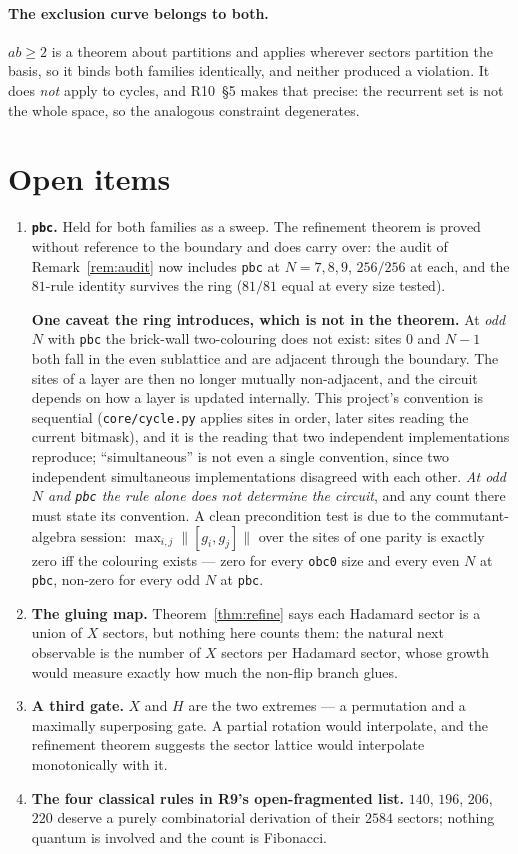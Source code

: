 \documentclass[11pt]{article}
\newcommand{\rt}[1]{\texttt{#1}}
\newcommand{\fn}[1]{\texttt{#1}}
\theoremstyle{plain}
\theoremstyle{remark}
\begin{document}
\paragraph{The exclusion curve belongs to both.} $ab\ge2$ is a theorem about
partitions and applies wherever sectors partition the basis, so it binds both
families identically, and neither produced a violation. It does \emph{not} apply
to cycles, and R10~\S5 makes that precise: the recurrent set is not the whole
space, so the analogous constraint degenerates.

\section{Open items}

\begin{enumerate}
\item \textbf{\rt{pbc}.} Held for both families as a sweep. The refinement
  theorem is proved without reference to the boundary and does carry over: the
  audit of Remark~\ref{rem:audit} now includes \fn{pbc} at $N=7,8,9$, $256/256$
  at each, and the $81$-rule identity survives the ring ($81/81$ equal at every
  size tested).

  \textbf{One caveat the ring introduces, which is not in the theorem.} At
  \emph{odd} $N$ with \fn{pbc} the brick-wall two-colouring does not exist: sites
  $0$ and $N-1$ both fall in the even sublattice and are adjacent through the
  boundary. The sites of a layer are then no longer mutually non-adjacent, and
  the circuit depends on how a layer is updated internally. This project's
  convention is sequential (\fn{core/cycle.py} applies sites in order, later
  sites reading the current bitmask), and it is the reading that two independent
  implementations reproduce; ``simultaneous'' is not even a single convention,
  since two independent simultaneous implementations disagreed with each other.
  \emph{At odd $N$ and \fn{pbc} the rule alone does not determine the circuit},
  and any count there must state its convention. A clean precondition test is
  due to the commutant-algebra session: $\max_{i,j}\lVert[g_i,g_j]\rVert$ over
  the sites of one parity is exactly zero iff the colouring exists --- zero for
  every \fn{obc0} size and every even $N$ at \fn{pbc}, non-zero for every odd
  $N$ at \fn{pbc}.
\item \textbf{The gluing map.} Theorem~\ref{thm:refine} says each Hadamard sector
  is a union of $X$ sectors, but nothing here counts them: the natural next
  observable is the number of $X$ sectors per Hadamard sector, whose growth would
  measure exactly how much the non-flip branch glues.
\item \textbf{A third gate.} $X$ and $H$ are the two extremes --- a permutation and
  a maximally superposing gate. A partial rotation would interpolate, and the
  refinement theorem suggests the sector lattice would interpolate monotonically
  with it.
\item \textbf{The four classical rules in R9's open-fragmented list.} $140$,
  $196$, $206$, $220$ deserve a purely combinatorial derivation of their $2584$
  sectors; nothing quantum is involved and the count is Fibonacci.
\end{enumerate}
\end{document}

